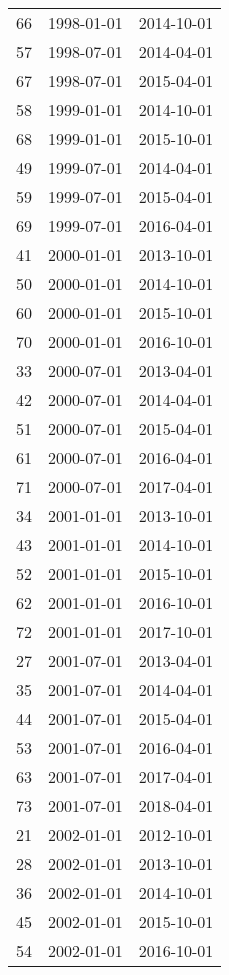 % 
\begin{tabular}{ccc}
  \hline
  \hline
66 & 1998-01-01 & 2014-10-01 \\ 
  57 & 1998-07-01 & 2014-04-01 \\ 
  67 & 1998-07-01 & 2015-04-01 \\ 
  58 & 1999-01-01 & 2014-10-01 \\ 
  68 & 1999-01-01 & 2015-10-01 \\ 
  49 & 1999-07-01 & 2014-04-01 \\ 
  59 & 1999-07-01 & 2015-04-01 \\ 
  69 & 1999-07-01 & 2016-04-01 \\ 
  41 & 2000-01-01 & 2013-10-01 \\ 
  50 & 2000-01-01 & 2014-10-01 \\ 
  60 & 2000-01-01 & 2015-10-01 \\ 
  70 & 2000-01-01 & 2016-10-01 \\ 
  33 & 2000-07-01 & 2013-04-01 \\ 
  42 & 2000-07-01 & 2014-04-01 \\ 
  51 & 2000-07-01 & 2015-04-01 \\ 
  61 & 2000-07-01 & 2016-04-01 \\ 
  71 & 2000-07-01 & 2017-04-01 \\ 
  34 & 2001-01-01 & 2013-10-01 \\ 
  43 & 2001-01-01 & 2014-10-01 \\ 
  52 & 2001-01-01 & 2015-10-01 \\ 
  62 & 2001-01-01 & 2016-10-01 \\ 
  72 & 2001-01-01 & 2017-10-01 \\ 
  27 & 2001-07-01 & 2013-04-01 \\ 
  35 & 2001-07-01 & 2014-04-01 \\ 
  44 & 2001-07-01 & 2015-04-01 \\ 
  53 & 2001-07-01 & 2016-04-01 \\ 
  63 & 2001-07-01 & 2017-04-01 \\ 
  73 & 2001-07-01 & 2018-04-01 \\ 
  21 & 2002-01-01 & 2012-10-01 \\ 
  28 & 2002-01-01 & 2013-10-01 \\ 
  36 & 2002-01-01 & 2014-10-01 \\ 
  45 & 2002-01-01 & 2015-10-01 \\ 
  54 & 2002-01-01 & 2016-10-01 \\ 

\end{tabular}
